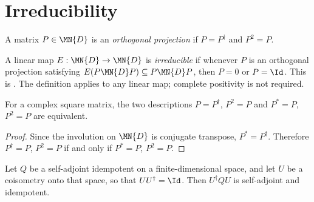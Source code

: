 \section{Irreducibility}

\begin{definition}
    \label{def:orthogonal_projection_channel}
    \leanok
    A matrix $P \in \MN{D}$ is an \emph{orthogonal projection} if
    $P = P^\dagger$ and $P^2 = P$.
\end{definition}

\begin{definition}\label{def:irreducible_cp}
    \leanok
    A linear map
    $E : \MN{D} \to \MN{D}$ is \emph{irreducible}
    if whenever $P$ is an orthogonal projection satisfying
    $E(P \MN{D} P) \subseteq P \MN{D} P$,
    then $P = 0$ or $P = \Id$.
    This is \cite[Theorem~6.2(1)]{Wolf2012Quantum}.
    The definition applies to any linear map; complete positivity
    is not required.
\end{definition}

\begin{theorem}
    \label{thm:orthogonal_projection_star_projection_channel}
    \leanok
    For a complex square matrix, the two descriptions
    $P=P^\dagger$, $P^2=P$ and $P^*=P$, $P^2=P$ are equivalent.
\end{theorem}

\begin{proof}\leanok
    Since the involution on $\MN{D}$ is conjugate transpose,
    $P^*=P^\dagger$. Therefore $P^\dagger=P$, $P^2=P$ if and only if
    $P^*=P$, $P^2=P$.
\end{proof}

\begin{theorem}
    \label{thm:star_projection_coisometric_transport}
    \leanok
    Let $Q$ be a self-adjoint idempotent on a finite-dimensional space, and
    let $U$ be a coisometry onto that space, so that $UU^\dagger=\Id$. Then
    $U^\dagger Q U$ is self-adjoint and idempotent.
\end{theorem}

